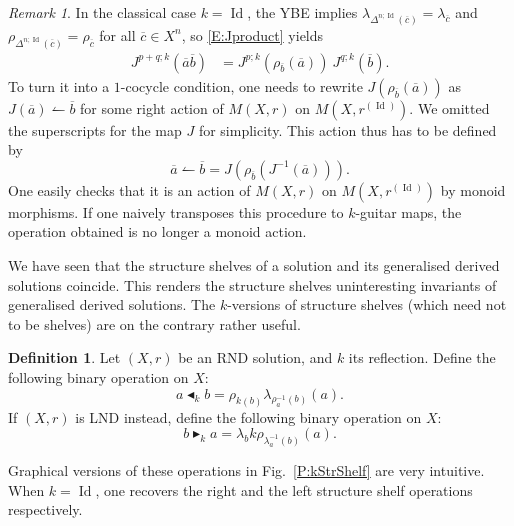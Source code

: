 \documentclass{amsart}
\newcommand{\Id}{\operatorname{Id}}
\newcommand\kop{\mathrel{\blacktriangleleft_k}}
\newcommand\klop{\mathrel{\blacktriangleright_k}}
\theoremstyle{plain}
\theoremstyle{definition}
\newtheorem{defn}[thm]{Definition}
\theoremstyle{remark}
\newtheorem{rem}[thm]{Remark}
\begin{document}
\begin{rem} In the classical case $k=\Id$, the YBE implies $\lambda_{\Delta^{n;\Id}(\overline{c})}=\lambda_{\overline{c}}$ and $\rho_{\Delta^{n;\Id}(\overline{c})}=\rho_{\overline{c}}$ for all $\overline{c} \in X^n$, so \eqref{E:Jproduct} yields
\begin{align*}
J^{p+q;k}(\overline{a}\overline{b}) &= J^{p;k}(\rho_{\overline{b}}(\overline{a}))\ J^{q;k}(\overline{b}).
\end{align*}
To turn it into a $1$-cocycle condition, one needs to rewrite $J(\rho_{\overline{b}}(\overline{a}))$ as $J(\overline{a})\leftharpoonup \overline{b}$ for some right action of $M(X,r)$ on $M(X,r^{(\Id)})$. We omitted the superscripts for the map $J$ for simplicity. This action thus has to be defined by 
\[\overline{a}\leftharpoonup \overline{b} = J(\rho_{\overline{b}}(J^{-1}(\overline{a}))).\]
One easily checks that it is an action of $M(X,r)$ on $M(X,r^{(\Id)})$ by monoid morphisms. If one naively transposes this procedure to $k$-guitar maps, the operation obtained is no longer a monoid action.
\end{rem}

We have seen that the structure shelves of a solution and its generalised derived solutions coincide. This renders the structure shelves uninteresting invariants of generalised derived solutions. The $k$-versions of structure shelves (which need not to be shelves) are on the contrary rather useful.

\begin{defn}\label{D:kops}
Let $(X,r)$ be an RND solution, and $k$ its reflection. Define the following binary operation on $X$:
\[a \kop b =  \rho_{k(b)} \lambda_{\rho_a^{-1}(b)}(a).\]
If $(X,r)$ is LND instead, define the following binary operation on $X$:
\[b \klop a = \lambda_b k\rho_{\lambda_a^{-1}(b)}(a).\]
\end{defn}

Graphical versions of these operations in Fig.~\ref{P:kStrShelf} are very intuitive. When $k=\Id$, one recovers the right and the left structure shelf operations respectively.
\end{document}

